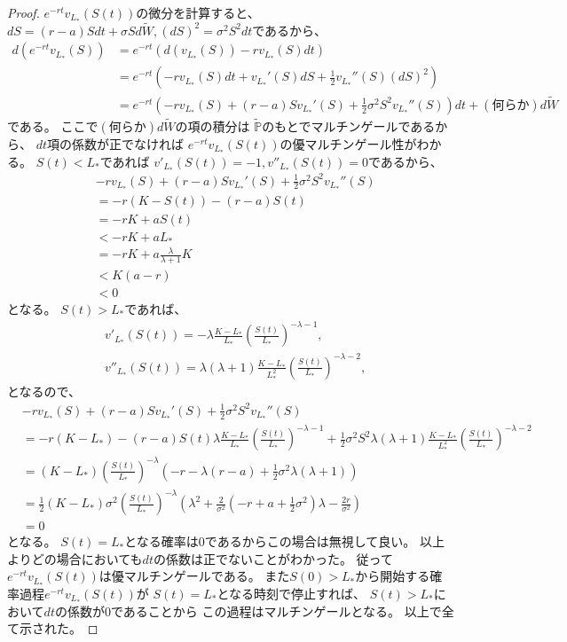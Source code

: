 \documentclass[uplatex]{jsarticle}
\theoremstyle{definition}
\def\P{\mathbb{P}}
\begin{document}
\begin{proof}
  \(e^{-rt}v_{L_*}(S(t))\)の微分を計算すると、
  \(dS = (r-a)Sdt + \sigma Sd\tilde{W},
  (dS)^2 = \sigma^2S^2dt\)であるから、
  \begin{align*}
    d\left( e^{-rt}v_{L_*}(S)\right)
    &= e^{-rt} \left( d(v_{L_*}(S)) - rv_{L_*}(S)dt \right) \\
    &= e^{-rt} \left( - rv_{L_*}(S)dt
    + v_{L_*}'(S)dS + \frac{1}{2}v_{L_*}''(S) (dS)^2 \right) \\
    &= e^{-rt} \left( - rv_{L_*}(S)
    + (r-a)Sv_{L_*}'(S) + \frac{1}{2}\sigma^2S^2v_{L_*}''(S) \right) dt
    + (\text{何らか})d\tilde{W}
  \end{align*}
  である。
  ここで\((\text{何らか})d\tilde{W}\)の項の積分は
  \(\tilde{\P}\)のもとでマルチンゲールであるから、
  \(dt\)項の係数が正でなければ
  \(e^{-rt}v_{L_*}(S(t))\)の優マルチンゲール性がわかる。
  \(S(t) < L_*\)であれば
  \(v'_{L_*}(S(t)) = -1, v''_{L_*}(S(t)) = 0\)であるから、
  \begin{align*}
    &- rv_{L_*}(S)
    + (r-a)Sv_{L_*}'(S) + \frac{1}{2}\sigma^2S^2v_{L_*}''(S) \\
    &= - r(K-S(t)) - (r-a)S(t) \\
    &= -rK + aS(t) \\
    &< -rK + aL_* \\
    &= -rK + a\frac{\lambda}{\lambda+1}K \\
    &< K\left( a - r\right) \\
    &< 0
  \end{align*}
  となる。
  \(S(t) > L_*\)であれば、
  \begin{align*}
    &v'_{L_*}(S(t))
    = -\lambda\frac{K-L_*}{L_*}\left(\frac{S(t)}{L_*}\right)^{-\lambda-1}, \\
    &v''_{L_*}(S(t))
    = \lambda(\lambda+1)\frac{K-L_*}{L_*^2}
    \left(\frac{S(t)}{L_*}\right)^{-\lambda-2},
  \end{align*}
  となるので、
  \begin{align*}
    &- rv_{L_*}(S)
    + (r-a)Sv_{L_*}'(S) + \frac{1}{2}\sigma^2S^2v_{L_*}''(S) \\
    &= -r(K-L_*)
    - (r-a)S(t)\lambda\frac{K-L_*}{L_*}\left(\frac{S(t)}{L_*}\right)^{-\lambda-1}
    + \frac{1}{2}\sigma^2S^2\lambda(\lambda+1)\frac{K-L_*}{L_*^2}
    \left(\frac{S(t)}{L_*}\right)^{-\lambda-2} \\
    &= (K-L_*)\left( \frac{S(t)}{L_*}\right)^{-\lambda}
    \left( -r - \lambda(r-a) + \frac{1}{2}\sigma^2\lambda(\lambda+1) \right) \\
    &= \frac{1}{2}(K-L_*)\sigma^2\left( \frac{S(t)}{L_*}\right)^{-\lambda}
    \left( \lambda^2
    + \frac{2}{\sigma^2}\left( -r+a+\frac{1}{2}\sigma^2\right)\lambda
    - \frac{2r}{\sigma^2}\right) \\
    &= 0
  \end{align*}
  となる。
  \(S(t) = L_*\)となる確率は\(0\)であるからこの場合は無視して良い。
  以上よりどの場合においても\(dt\)の係数は正でないことがわかった。
  従って\(e^{-rt}v_{L_*}(S(t))\)は優マルチンゲールである。
  また\(S(0) > L_*\)から開始する確率過程\(e^{-rt}v_{L_*}(S(t))\)が
  \(S(t) = L_*\)となる時刻で停止すれば、
  \(S(t) > L_*\)において\(dt\)の係数が\(0\)であることから
  この過程はマルチンゲールとなる。
  以上で全て示された。


\end{proof}
\end{document}
